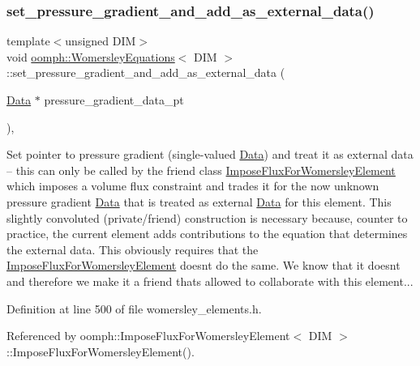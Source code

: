 \subsubsection{\texorpdfstring{set\+\_\+pressure\+\_\+gradient\+\_\+and\+\_\+add\+\_\+as\+\_\+external\+\_\+data()}{set\_pressure\_gradient\_and\_add\_as\_external\_data()}}
{\footnotesize\ttfamily template$<$unsigned D\+IM$>$ \\
void \hyperlink{classoomph_1_1WomersleyEquations}{oomph\+::\+Womersley\+Equations}$<$ D\+IM $>$\+::set\+\_\+pressure\+\_\+gradient\+\_\+and\+\_\+add\+\_\+as\+\_\+external\+\_\+data (\begin{DoxyParamCaption}\item[{\hyperlink{classoomph_1_1Data}{Data} $\ast$}]{pressure\+\_\+gradient\+\_\+data\+\_\+pt }\end{DoxyParamCaption})\hspace{0.3cm}{\ttfamily [inline]}, {\ttfamily [private]}}



Set pointer to pressure gradient (single-\/valued \hyperlink{classoomph_1_1Data}{Data}) and treat it as external data -- this can only be called by the friend class \hyperlink{classoomph_1_1ImposeFluxForWomersleyElement}{Impose\+Flux\+For\+Womersley\+Element} which imposes a volume flux constraint and trades it for the now unknown pressure gradient \hyperlink{classoomph_1_1Data}{Data} that is treated as external \hyperlink{classoomph_1_1Data}{Data} for this element. This slightly convoluted (private/friend) construction is necessary because, counter to practice, the current element adds contributions to the equation that determines the external data. This obviously requires that the \hyperlink{classoomph_1_1ImposeFluxForWomersleyElement}{Impose\+Flux\+For\+Womersley\+Element} doesn\textquotesingle{}t do the same. We know that it doesn\textquotesingle{}t and therefore we make it a friend that\textquotesingle{}s allowed to collaborate with this element... 



Definition at line 500 of file womersley\+\_\+elements.\+h.



Referenced by oomph\+::\+Impose\+Flux\+For\+Womersley\+Element$<$ D\+I\+M $>$\+::\+Impose\+Flux\+For\+Womersley\+Element().

\mbox{\label{classoomph_1_1WomersleyEquations_ada82ee649d9a6d7469166fd497222594}} 

